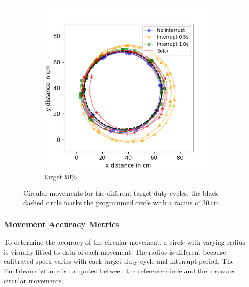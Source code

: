 \begin{figure}[h!]
	\begin{subfigure}[b]{0.49\textwidth}
		\includegraphics[width=\textwidth]{pics/circle_90.png}
		\caption{Target 90\%}
		\label{fig:circ_exp3}
	\end{subfigure}
	\caption{Circular movements for the different target duty cycles, the black dashed circle marks the programmed circle with a radius of 30\,cm.}
	\label{fig:circular_movements}
\end{figure}

\subsubsection{Movement Accuracy Metrics}

To determine the accuracy of the circular movement, a circle with varying radius is visually fitted to data of each movement.
The radius is different because calibrated speed varies with each target duty cycle and interrupt period.
The Euclidean distance is computed between the reference circle and the measured circular movements.


